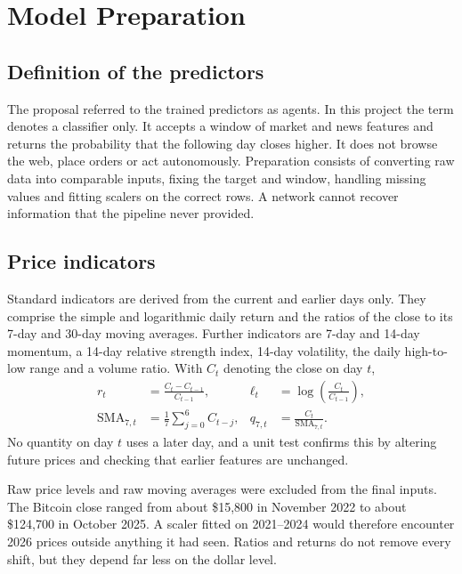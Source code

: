 \section{Model Preparation}
\label{ch:preparation}
\subsection{Definition of the predictors}
The proposal referred to the trained predictors as agents. In this project the term denotes a classifier only. It accepts a window of market and news features and returns the probability that the following day closes higher. It does not browse the web, place orders or act autonomously. Preparation consists of converting raw data into comparable inputs, fixing the target and window, handling missing values and fitting scalers on the correct rows. A network cannot recover information that the pipeline never provided.

\subsection{Price indicators}
Standard indicators are derived from the current and earlier days only. They comprise the simple and logarithmic daily return and the ratios of the close to its 7-day and 30-day moving averages. Further indicators are 7-day and 14-day momentum, a 14-day relative strength index, 14-day volatility, the daily high-to-low range and a volume ratio. With $C_t$ denoting the close on day $t$,
\begin{align}
r_t &= \frac{C_t-C_{t-1}}{C_{t-1}}, &
\ell_t &= \log\left(\frac{C_t}{C_{t-1}}\right),\\
\operatorname{SMA}_{7,t}&=\frac{1}{7}\sum_{j=0}^{6}C_{t-j}, &
q_{7,t}&=\frac{C_t}{\operatorname{SMA}_{7,t}}.
\end{align}
No quantity on day $t$ uses a later day, and a unit test confirms this by altering future prices and checking that earlier features are unchanged.

Raw price levels and raw moving averages were excluded from the final inputs. The Bitcoin close ranged from about \$15{,}800 in November 2022 to about \$124{,}700 in October 2025. A scaler fitted on 2021--2024 would therefore encounter 2026 prices outside anything it had seen. Ratios and returns do not remove every shift, but they depend far less on the dollar level.

